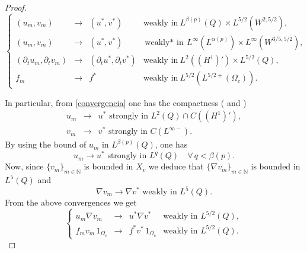 \documentclass[11pt,reqno]{amsart}%
\numberwithin{equation}{section}
\begin{document}
{\begin{proof}
\begin{equation}\label{convergencia}
\left\{
\begin{array}{rcll}
    (u_m,v_m)&\rightarrow&(u^*,v^*)&\text{weakly in}\ 
   L^{\beta(p)}(Q)\times L^{5/2}(W^{2,5/2}),
   \\
    \left(u_m,v_m\right)&\rightarrow&(u^*,v^*) &\text{weakly${*}$ in}\
   L^{\infty}(L^{\alpha(p)})\times L^{\infty}(W^{6/5,5/2}),
\\
    \left(\partial_t u_m, \partial_t v_m\right)&\rightarrow& (\partial_t u^*,\partial_t v^*)
    &\text{weakly in}\      L^{2}((H^1)')\times L^{5/2}(Q), \\
      f_m&\rightarrow& f^*\ &\text{weakly in}\ L^{5/2}(L^{5/2+}(\Omega_c)) .
\end{array}
\right.
\end{equation}

In particular, from \eqref{convergencia}   one has the compactness (\cite[Theorem 5.1]{Lions} and \cite[Corollary 4]{Simon})
\begin{eqnarray}
u_m&\to& u^*\mbox{ strongly in }%
L^2(Q)\cap C((H^1)'),\\\label{conv-x}
v_m&\to& v^*\mbox{ strongly in }
C(L^{\infty-}).\label{conv-x1}
\end{eqnarray}
By using the bound of $u_m$ in $L^{\beta(p)}(Q)$, one has 
$$
u_m\to u^*\mbox{ strongly in } L^q(Q) \quad \forall\, q<\beta(p).
$$
Now, since $\{v_m\}_{m\in\mathbb{N}}$ is bounded in $X_v$ we deduce that 
$\{\nabla v_m\}_{m\in\mathbb{N}}$ is bounded in $L^5(Q)$ and 
$$
\nabla v_m \to \nabla v^* \mbox{ weakly in } L^5(Q).
$$
From the above convergences 
we get
\begin{equation}\label{con-x2}
\left\{
\begin{array}{rcll}
u_m\nabla v_m&\to&u^*\nabla v^* &\mbox{weakly in } L^{5/2}(Q), \\
f_mv_m\,1_{\Omega_c}&\to&f^*v^*\,1_{\Omega_c} &\mbox{weakly in }L^{5/2}(Q).
\end{array}
\right.
\end{equation}



\end{proof}}
\end{document}
